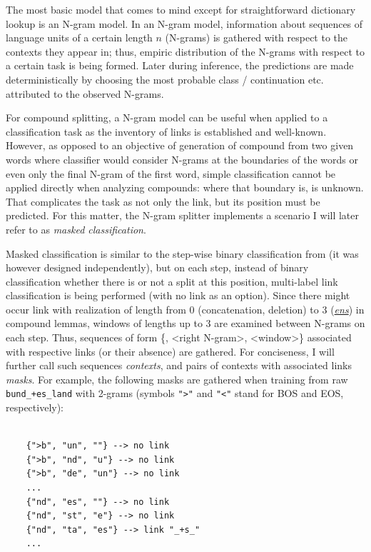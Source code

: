 \documentclass[11pt]{article}
\begin{document}
The most basic model that comes to mind except for straightforward dictionary lookup is an N-gram model. In an N-gram model, information about sequences of language units of a certain length $n$ (N-grams) is gathered with respect to the contexts they appear in; thus, empiric distribution of the N-grams with respect to a certain task is being formed. Later during inference, the predictions are made deterministically by choosing the most probable class / continuation etc. attributed to the observed N-grams.

For compound splitting, a N-gram model can be useful when applied to a classification task as the inventory of links is established and well-known. However, as opposed to an objective of generation of compound from two given words where classifier would consider N-grams at the boundaries of the words or even only the final N-gram of the first word, simple classification cannot be applied directly when analyzing compounds: where that boundary is, is unknown. That complicates the task as not only the link, but its position must be predicted. For this matter, the N-gram splitter implements a scenario I will later refer to as \textit{masked classification}.

Masked classification is similar to the step-wise binary classification from \citet{Tuggener2018EvaluatingNS} (it was however designed independently), but on each step, instead of binary classification whether there is or not a split at this position, multi-label link classification is being performed (with no link as an option). Since there might occur link with realization of length from 0 (concatenation, deletion) to 3 (\textit{\underline{ens}}) in compound lemmas, windows of lengths up to 3 are examined between N-grams on each step. Thus, sequences of form \{<left N-gram>, <right N-gram>, <window>\} associated with respective links (or their absence) are gathered. For conciseness, I will further call such sequences \textit{contexts}, and pairs of contexts with associated links \textit{masks}. For example, the following masks are gathered when training from raw \texttt{bund\_+es\_land} with 2-grams (symbols \texttt{">"} and \texttt{"<"} stand for BOS and EOS, respectively):

\begin{verbatim}
	
	{">b", "un", ""} --> no link
	{">b", "nd", "u"} --> no link
	{">b", "de", "un"} --> no link
	...
	{"nd", "es", ""} --> no link
	{"nd", "st", "e"} --> no link
	{"nd", "ta", "es"} --> link "_+s_"
	...

\end{verbatim}
\end{document}
